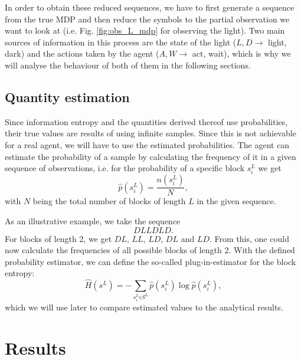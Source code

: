 \documentclass[12pt,a4paper]{article}
\begin{document}
In order to obtain these reduced sequences, we have to first generate a sequence from the true MDP and then reduce the symbols to the partial observation we want to look at (i.e. Fig. \ref{fig:obs_L_mdp} for observing the light).
Two main sources of information in this process are the state of the light ($L,D \to$ light, dark) and the actions taken by the agent ($A,W \to$ act, wait), which is why we will analyse the behaviour of both of them in the following sections.

\subsection{Quantity estimation}
Since information entropy and the quantities derived thereof use probabilities, their true values are results of using infinite samples.
Since this is not achievable for a real agent, we will have to use the estimated probabilities.
The agent can estimate the probability of a sample by calculating the frequency of it in a given sequence of observations, i.e. for the probability of a specific block $s_i^L$ we get
\begin{equation}
    \label{eq:prob_estimator}
    \hat{p}(s_i^L) = \frac{n(s_i^L)}{N},
\end{equation}
with $N$ being the total number of blocks of length $L$ in the given sequence.

As an illustrative example, we take the sequence
\begin{equation*}
    D L L D L D.
\end{equation*}
For blocks of length 2, we get $DL$, $LL$, $LD$, $DL$ and $LD$.
From this, one could now calculate the frequencies of all possible blocks of length 2.
With the defined probability estimator, we can define the so-called plug-in-estimator for the block entropy:
\begin{equation}
    \label{eq:plug_in_block_ent}
    \hat{H}(s^L) = -\sum_{s_i^L \epsilon S^L} \hat{p}(s_i^L) \log \hat{p}(s_i^L),
\end{equation}
which we will use later to compare estimated values to the analytical results.

\newpage
\section{Results} \label{sec:results}
\end{document}
